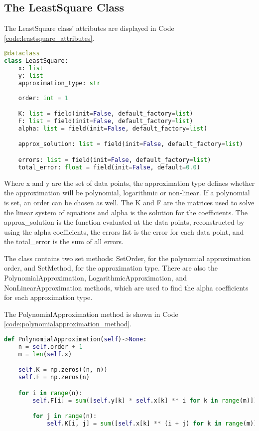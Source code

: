 \subsection{The LeastSquare Class}\label{subsec:leastsquares_class}
The LeastSquare class' attributes are displayed in Code \ref{code:leastsquare_attributes}.
\begin{lstlisting}[caption={Attributes of the LeastSquare class},label={code:leastsquare_attributes},language=python]
@dataclass
class LeastSquare:
    x: list
    y: list 
    approximation_type: str
    
    order: int = 1

    K: list = field(init=False, default_factory=list)
    F: list = field(init=False, default_factory=list)
    alpha: list = field(init=False, default_factory=list)

    approx_solution: list = field(init=False, default_factory=list)

    errors: list = field(init=False, default_factory=list)
    total_error: float = field(init=False, default=0.0)
\end{lstlisting}

Where x and y are the set of data points, the approximation type defines whether the approximation will be polynomial, logarithmic or non-linear. If a polynomial is set, an order can be chosen as well. The K and F are the matrices used to solve the linear system of equations and alpha is the solution for the coefficients. The approx\_solution is the function evaluated at the data points, reconstructed by using the alpha coefficients, the errors list is the error for each data point, and the total\_error is the sum of all errors. 

The class contains two set methods: SetOrder, for the polynomial approximation order, and SetMethod, for the approximation type. There are also the PolynomialApproximation, LogarithmicApproximation, and NonLinearApproximation methods, which are used to find the alpha coefficients for each approximation type. 

The PolynomialApproximation method is shown in Code \ref{code:polynomialapproximation_method}.
\begin{lstlisting}[caption={PolynomialApproximation method},label={code:polynomialapproximation_method},language=python]
def PolynomialApproximation(self)->None:
    n = self.order + 1
    m = len(self.x)

    self.K = np.zeros((n, n))
    self.F = np.zeros(n)

    for i in range(n):
        self.F[i] = sum([self.y[k] * self.x[k] ** i for k in range(m)])

        for j in range(n):
            self.K[i, j] = sum([self.x[k] ** (i + j) for k in range(m)])
\end{lstlisting}


